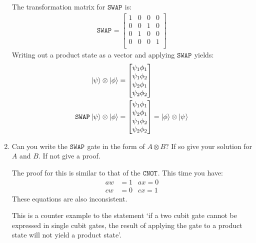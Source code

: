 \documentclass[12pt]{article}
\newcommand{\bmat}[1]{\begin{bmatrix}#1\end{bmatrix}}
\newenvironment{answer}{\begingroup\setlength{\leftskip}{-\leftmargin}\begin{framed}}{\end{framed}\endgroup}
\newcommand{\CNOT}[1]{\ensuremath{\texttt{CNOT}_{#1}}}
\newcommand{\SWAP}[1]{\ensuremath{\texttt{SWAP}_{#1}}}
\begin{document}
\begin{enumerate}
    \begin{answer}
        The transformation matrix for \SWAP{} is:
        \begin{align*}
            \SWAP{} = \bmat{
                1 & 0 & 0 & 0 \\
                0 & 0 & 1 & 0 \\
                0 & 1 & 0 & 0 \\
                0 & 0 & 0 & 1 \\
            }
        \end{align*}
        Writing out a product state as a vector and applying \SWAP{} yields:
        \begin{align*}
            \ket{\psi}\otimes\ket{\phi} &= \bmat{
                \psi_1\phi_1 \\
                \psi_1\phi_2 \\
                \psi_2\phi_1 \\
                \psi_2\phi_2
            } \\
            \SWAP{}\ket{\psi}\otimes\ket{\phi} &= \bmat{
                \psi_1\phi_1 \\
                \psi_2\phi_1 \\
                \psi_1\phi_2 \\
                \psi_2\phi_2
            } = \ket{\phi}\otimes\ket{\psi}
        \end{align*}
    \end{answer}

    \item Can you write the \SWAP{} gate in the form of $A \otimes B$? If so give your solution for $A$ and $B$. If not give a proof.

    \begin{answer}
        The proof for this is similar to that of the \CNOT{}. This time you have:
        \begin{align*}
            aw &= 1 & ax = 0 \\
            cw &= 0 & cx = 1
        \end{align*}
        These equations are also inconsistent.

        This is a counter example to the statement `if a two cubit gate cannot be expressed in single cubit gates, the result of applying the gate to a product state will not yield a product state'.
    \end{answer}
\end{enumerate}
\end{document}
